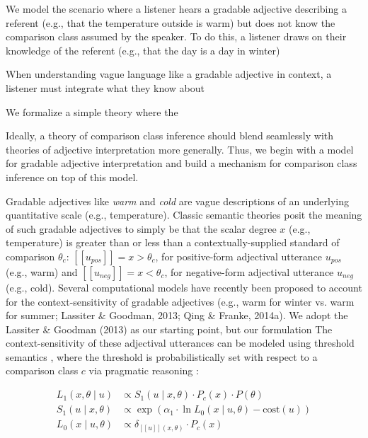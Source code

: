 \documentclass[doc]{apa6}
\begin{document}
We model the scenario where a listener hears a gradable adjective describing a referent (e.g., that the temperature outside is warm) but does not know the comparison class assumed by the speaker. 
To do this, a listener draws on their knowledge of the referent (e.g., that the day is a day in winter)

When understanding vague language like a gradable adjective in context, a listener must integrate what they know about 

We formalize a simple theory where the 

Ideally, a theory of comparison class inference should blend seamlessly with theories of adjective interpretation more generally. 
Thus, we begin with a model for gradable adjective interpretation and build a mechanism for comparison class inference on top of this model. 

Gradable adjectives like \emph{warm} and \emph{cold} are vague
descriptions of an underlying quantitative scale (e.g., temperature).
Classic semantic theories posit the meaning of such gradable adjectives to simply be that the scalar degree $x$ (e.g., temperature) is greater than or less than a contextually-supplied standard of comparison  \(\theta_c\): \([\![u_{pos}]\!] = x > \theta_c\), for positive-form adjectival utterance \(u_{pos}\) (e.g., warm) and \([\![u_{neg}]\!] = x < \theta_c\), for negative-form adjectival utterance \(u_{neg}\) (e.g., cold).
Several computational models have recently been proposed to account for the context-sensitivity of gradable adjectives (e.g., warm for winter vs. warm for summer; Lassiter \& Goodman, 2013;
Qing \& Franke, 2014a).
We adopt the  Lassiter \& Goodman (2013) as our starting point, but our formulation 
The context-sensitivity of these adjectival utterances can
be modeled using threshold semantics , where
the threshold is probabilistically set with respect to a comparison
class \(c\) via pragmatic reasoning :

\begin{align}
L_{1}(x, \theta \mid u) &\propto S_{1}(u \mid x, \theta) \cdot P_{c}(x) \cdot P(\theta) \label{eq:L1} \\
S_{1}(u \mid x, \theta) &\propto \exp{(\alpha_1 \cdot \ln {L_{0}(x \mid u, \theta)} - \text{cost}(u))} \label{eq:S1}\\
L_{0}(x \mid u, \theta) &\propto {\delta_{[\![u]\!](x, \theta)} \cdot P_{c}(x)} \label{eq:L0}
\end{align}
\end{document}
